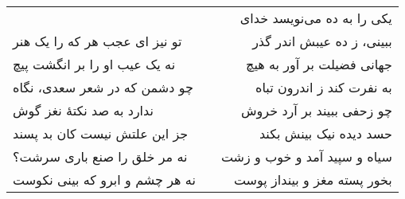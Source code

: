 \begin{center}
\begin{longtable}{l p{0.5cm} r}
&&
یکی را به ده می‌نویسد خدای
\\
تو نیز ای عجب هر که را یک هنر
&&
ببینی، ز ده عیبش اندر گذر
\\
نه یک عیب او را بر انگشت پیچ
&&
جهانی فضیلت بر آور به هیچ
\\
چو دشمن که در شعر سعدی، نگاه
&&
به نفرت کند ز اندرون تباه
\\
ندارد به صد نکتهٔ نغز گوش
&&
چو زحفی ببیند بر آرد خروش
\\
جز این علتش نیست کان بد پسند
&&
حسد دیده نیک بینش بکند
\\
نه مر خلق را صنع باری سرشت؟
&&
سیاه و سپید آمد و خوب و زشت
\\
نه هر چشم و ابرو که بینی نکوست
&&
بخور پسته مغز و بینداز پوست
\\
\end{longtable}
\end{center}
